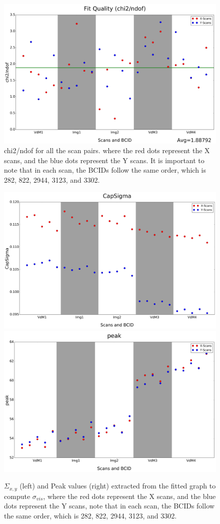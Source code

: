 \begin{center}
  \begin{figure}[h!]
    \centering
    \includegraphics[scale=.03]{Chapter4/DGConst_chi2.png}
    \caption[chi2/ndof for all scan pairs]{ chi2/ndof for all the scan pairs.  where the red dots represent the X scans, and the blue dots represent the Y scans. It is important to note that in each scan, the BCIDs follow the same order, which is 282, 822, 2944, 3123, and 3302.} 
    \label{chi2/ndof}
  \end{figure}
\end{center}

\begin{center}
  \begin{figure}[h!]
    \centering
    \includegraphics[width=.49\textwidth]{Chapter4/DGConst_CapSigma.png}
    \includegraphics[width=.48\textwidth]{Chapter4/DGConst_peak.png}
    \caption[$\Sigma_{x,y}$ and peak values for all scan pairs]{$\Sigma_{x,y}$ (left) and Peak values (right) extracted from the fitted graph to compute $\sigma_{vis}$, where the red dots represent the X scans, and the blue dots represent the Y scans, note that in each scan, the BCIDs follow the same order, which is 282, 822, 2944, 3123, and 3302.} 
    \label{capsigma_peak}
  \end{figure}
\end{center}

